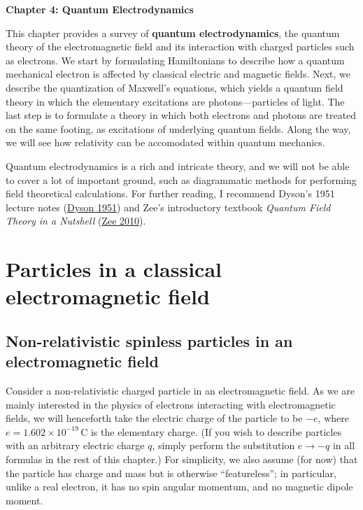 \documentclass[pra,12pt]{revtex4}
\begin{document}
\begin{center}
{\Large \textbf{Chapter 4: Quantum Electrodynamics}}
\end{center}

This chapter provides a survey of \textbf{quantum electrodynamics},
the quantum theory of the electromagnetic field and its interaction
with charged particles such as electrons.  We start by formulating
Hamiltonians to describe how a quantum mechanical electron is affected
by classical electric and magnetic fields.  Next, we describe the
quantization of Maxwell's equations, which yields a quantum field
theory in which the elementary excitations are photons---particles of
light.  The last step is to formulate a theory in which both electrons
and photons are treated on the same footing, as excitations of
underlying quantum fields.  Along the way, we will see how relativity
can be accomodated within quantum mechanics.

Quantum electrodynamics is a rich and intricate theory, and we will
not be able to cover a lot of important ground, such as diagrammatic
methods for performing field theoretical calculations.  For further
reading, I recommend Dyson's 1951 lecture notes
(\hyperref[cite:dyson]{Dyson 1951}) and Zee's introductory textbook
\textit{Quantum Field Theory in a Nutshell} (\hyperref[cite:zee]{Zee
  2010}).

\section{Particles in a classical electromagnetic field}

\subsection{Non-relativistic spinless particles in an electromagnetic field}
\label{sec:nonrel}

Consider a non-relativistic charged particle in an electromagnetic
field.  As we are mainly interested in the physics of electrons
interacting with electromagnetic fields, we will henceforth take the
electric charge of the particle to be $-e$, where $e =
1.602\times10^{-19}\,\mathrm{C}$ is the elementary charge.  (If you
wish to describe particles with an arbitrary electric charge $q$,
simply perform the substitution $e \rightarrow -q$ in all formulas in
the rest of this chapter.)  For simplicity, we also assume (for now)
that the particle has charge and mass but is otherwise
``featureless''; in particular, unlike a real electron, it has no spin
angular momentum, and no magnetic dipole moment.
\end{document}
